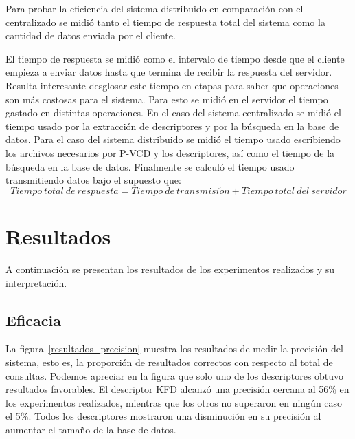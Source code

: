 Para probar la eficiencia del sistema distribuido en comparación con el centralizado se midió tanto el tiempo de respuesta total del sistema como la cantidad de datos enviada por el cliente. 

El tiempo de respuesta se midió como el intervalo de tiempo desde que el cliente empieza a enviar datos hasta que termina de recibir la respuesta del servidor. Resulta interesante desglosar este tiempo en etapas para saber que operaciones son más costosas para el sistema. Para esto se midió en el servidor el tiempo gastado en distintas operaciones. En el caso del sistema centralizado se midió el tiempo usado por la extracción de descriptores y por la búsqueda en la base de datos. Para el caso del sistema distribuido se midió el tiempo usado escribiendo los archivos necesarios por P-VCD y los descriptores, así como el tiempo de la búsqueda en la base de datos. Finalmente se calculó el tiempo usado transmitiendo datos bajo el supuesto que:
\begin{equation*}
\displaystyle{Tiempo\ total\ de\ respuesta}  =  \displaystyle{Tiempo\ de\ transmisi\acute{o}n} + \displaystyle{Tiempo\ total\ del\ servidor} 
\end{equation*}

\section{Resultados}\label{resultados}
A continuación se presentan los resultados de los experimentos realizados y su interpretación. 

\subsection{Eficacia}

La figura~\ref{resultados_precision} muestra los resultados de medir la precisión del sistema, esto es, la proporción de resultados correctos con respecto al total de consultas. Podemos apreciar en la figura que  solo uno de los descriptores obtuvo resultados favorables. El descriptor KFD alcanzó una precisión cercana al 56\% en los experimentos realizados, mientras que los otros no superaron en ningún caso el 5\%. Todos los descriptores mostraron una disminución en su precisión al aumentar el tamaño de la base de datos.

